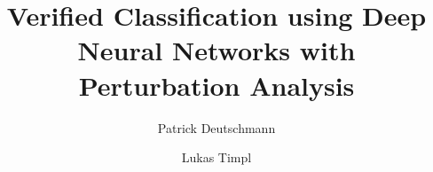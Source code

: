 \documentclass[acmsmall,nonacm]{acmart}
\begin{document}

\title{Verified Classification using Deep Neural Networks with Perturbation Analysis}


\author{Patrick Deutschmann}

\author{Lukas Timpl}


\begin{abstract}
\end{abstract}


\maketitle

\tableofcontents
\end{document}
